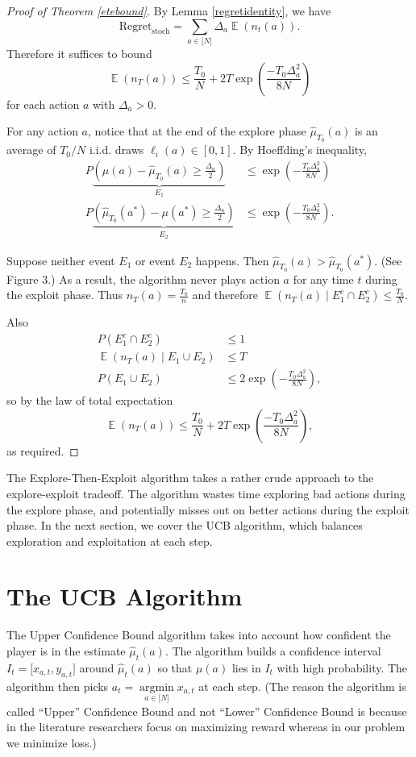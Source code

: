 \documentclass[11pt]{article}
\newcommand{\hmtn}{\hat{\mu}_{T_0}}
\newcommand{\bN}{\lbrack N \rbrack}
\newcommand{\E}{\mathop{{}\mathbb{E}}}
\DeclareMathOperator*{\argmin}{argmin}
\begin{document}
\begin{proof}[Proof of Theorem \ref{etebound}]

By Lemma \ref{regretidentity}, we have \[\text{Regret}_\text{stoch} = \sum_{a \in \bN} \Delta_a \E(n_t(a)).\] Therefore it suffices to bound \[\E\left(n_T(a)\right) \leq \frac{T_0}{N} + 2T\exp\left(\frac{-T_0\Delta_a^2}{8N}\right)\] for each action $a$ with $\Delta_a > 0.$ 

For any action $a$, notice that at the end of the explore phase $\hmtn(a)$ is an average of $T_0/N$ i.i.d. draws $\ell_i(a) \in [0,1]$. By Hoeffding's inequality,
\begin{align*}
    P \underbrace{\left(\mu(a)-\hmtn(a) \geq \frac{\Delta_a}{2} \right)}_{E_1} &\leq \exp\left(-\frac{T_0\Delta_a^2}{8N}\right) \\
    P \underbrace{\left(\hmtn(a^*) - \mu(a^*)\geq \frac{\Delta_a}{2} \right)}_{E_2} &\leq \exp\left(-\frac{T_0\Delta_a^2}{8N}\right).
\end{align*}

Suppose neither event $E_1$ or event $E_2$ happens. Then $\hmtn(a) > \hmtn(a^*)$. (See Figure 3.) As a result, the algorithm never plays action $a$ for any time $t$ during the exploit phase. Thus $n_T(a) = \frac{T_0}{n}$ and therefore $\E(n_T(a) \mid E_1^c \cap E_2^c) \leq \frac{T_0}{N}.$ 


Also \begin{align*} P(E_1^c \cap E_2^c) &\leq 1 \\ \E(n_T(a) \mid E_1 \cup E_2) &\leq T \\ P(E_1 \cup E_2) &\leq 2\exp\left(-\frac{T_0\Delta_a^2}{8N}\right),
\end{align*}
so by the law of total expectation \[\E\left(n_T(a)\right) \leq \frac{T_0}{N} + 2T\exp\left(\frac{-T_0\Delta_a^2}{8N}\right),\] as required. 
\end{proof}

The Explore-Then-Exploit algorithm takes a rather crude approach to the explore-exploit tradeoff. The algorithm wastes time exploring bad actions during the explore phase, and potentially misses out on better actions during the exploit phase. In the next section, we cover the UCB algorithm, which balances exploration and exploitation at each step.

\section{The UCB Algorithm}

The Upper Confidence Bound algorithm takes into account how confident the player is in the estimate $\hat{\mu}_t(a).$ The algorithm builds a confidence interval $I_t=\lbrack x_{a,t},y_{a,t}\rbrack$ around $\hat{\mu}_t(a)$ so that $\mu(a)$ lies in $I_t$ with high probability. The algorithm then picks $a_t = \argmin\limits_{a \in \bN} x_{a,t} $ at each step. (The reason the algorithm is called ``Upper''  Confidence Bound and not ``Lower'' Confidence Bound is because in the literature researchers focus on maximizing reward whereas in our problem we minimize loss.)
\end{document}
